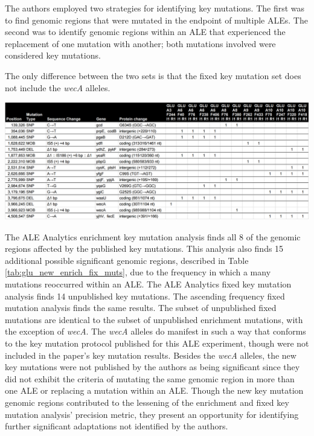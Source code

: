 \documentclass[12pt,final,masters,chapterheads]{ucsd}  %
\begin{document}
The authors employed two strategies for identifying key mutations. The first was to find genomic regions that were mutated in the endpoint of multiple ALEs.
The second was to identify genomic regions within an ALE that experienced the replacement of one mutation with another; both mutations involved were considered key mutations.
\begin{table}[H]
  \centering
  \caption[A combination of the new enrichment and fixed key mutations found by the automated analysis.]{ The only difference between the two sets is that the fixed key mutation set does not include the \textit{wecA} alleles.}
  \includegraphics[width=\textwidth]{glu_new_enrich_fix_muts.png}
  \label{tab:glu_new_enrich_fix_muts}
\end{table}
The ALE Analytics enrichment key mutation analysis finds all 8 of the genomic regions affected by the published key mutations. This analysis also finds 15 additional possible significant genomic regions, described in Table \ref{tab:glu_new_enrich_fix_muts}, due to the frequency in which a many mutations reoccurred within an ALE. The ALE Analytics fixed key mutation analysis finds 14 unpublished key mutations. The ascending frequency fixed mutation analysis finds the same results. The subset of unpublished fixed mutations are identical to the subset of unpublished enrichment mutations, with the exception of \textit{wecA}. The \textit{wecA} alleles do manifest in such a way that conforms to the key mutation protocol published for this ALE experiment, though were not included in the paper's key mutation results. Besides the \textit{wecA} alleles, the new key mutations were not published by the authors as being significant since they did not exhibit the criteria of mutating the same genomic region in more than one ALE or replacing a mutation within an ALE. Though the new key mutation genomic regions contributed to the lessening of the enrichment and fixed key mutation analysis' precision metric, they present an opportunity for identifying further significant adaptations not identified by the authors.
\end{document}
